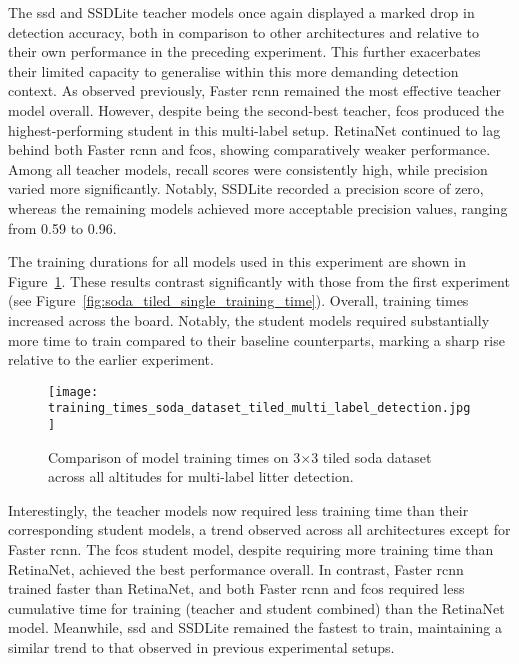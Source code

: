 The \gls{ssd} and SSDLite teacher models once again displayed a marked drop in detection accuracy, both in comparison to other architectures and relative to their own performance in the preceding experiment. This further exacerbates their limited capacity to generalise within this more demanding detection context. As observed previously, Faster \gls{rcnn} remained the most effective teacher model overall. However, despite being the second-best teacher, \gls{fcos} produced the highest-performing student in this multi-label setup. RetinaNet continued to lag behind both Faster \gls{rcnn} and \gls{fcos}, showing comparatively weaker performance.
Among all teacher models, recall scores were consistently high, while precision varied more significantly. Notably, SSDLite recorded a precision score of zero, whereas the remaining models achieved more acceptable precision values, ranging from 0.59 to 0.96.

The training durations for all models used in this experiment are shown in Figure~\ref{fig:soda_tiled_multi_training_time}. These results contrast significantly with those from the first experiment (see Figure~\ref{fig:soda_tiled_single_training_time}). Overall, training times increased across the board. Notably, the student models required substantially more time to train compared to their baseline counterparts, marking a sharp rise relative to the earlier experiment.

\begin{figure}[!ht]
    \centering
    \texttt{[image: training\_times\_soda\_dataset\_tiled\_multi\_label\_detection.jpg]}
    \caption{Comparison of model training times on 3$\times$3 tiled \gls{soda} dataset across all altitudes for multi-label litter detection.}
    \label{fig:soda_tiled_multi_training_time}
\end{figure}

Interestingly, the teacher models now required less training time than their corresponding student models, a trend observed across all architectures except for Faster \gls{rcnn}. The \gls{fcos} student model, despite requiring more training time than RetinaNet, achieved the best performance overall. In contrast, Faster \gls{rcnn} trained faster than RetinaNet, and both Faster \gls{rcnn} and \gls{fcos} required less cumulative time for training (teacher and student combined) than the RetinaNet model. Meanwhile, \gls{ssd} and SSDLite remained the fastest to train, maintaining a similar trend to that observed in previous experimental setups.


